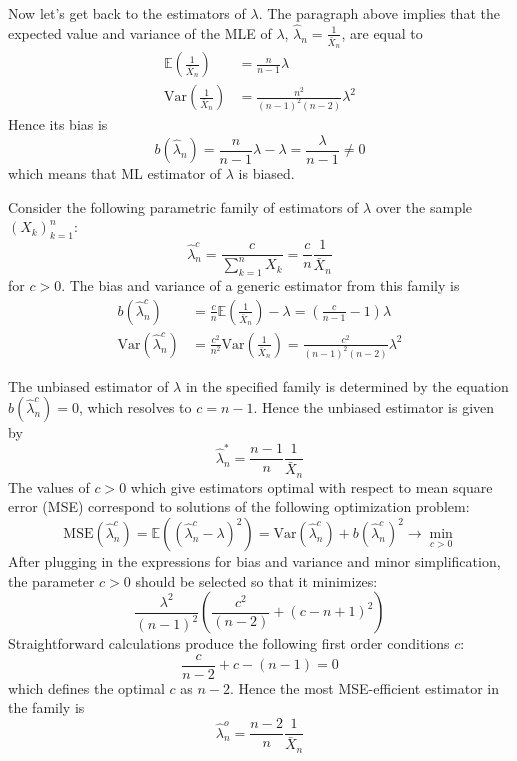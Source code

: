 \documentclass[a4paper]{article}
\newcommand{\brac}[1]{\left ( #1 \right )}
\newcommand{\Ex}[1]{\mathbb{E}\brac{#1}}
\newcommand{\Var}[1]{\text{Var}\brac{#1}}
\begin{document}
Now let's get back to the estimators of $\lambda$. The paragraph above implies that the expected value and variance of the MLE of $\lambda$, $\hat{\lambda}_n = \frac{1}{\bar{X}_n}$, are equal to\begin{align*}
\Ex{\frac{1}{\bar{X}_n}} &= \frac{n}{n-1}\lambda \\ \Var{\frac{1}{\bar{X}_n}} &= \frac{n^2}{\brac{n-1}^2\brac{n-2}} \lambda^2 \end{align*} Hence its bias is \[b\brac{\hat{\lambda}_n} = \frac{n}{n-1}\lambda - \lambda = \frac{\lambda}{n-1}\neq0\] which means that ML estimator of $\lambda$ is biased.

Consider the following parametric family of estimators of $\lambda$ over the sample $\brac{X_k}_{k=1}^n$: \[\hat{\lambda}_n^c = \frac{c}{\sum_{k=1}^n X_k} = \frac{c}{n} \frac{1}{\bar{X}_n}\] for $c>0$. The bias and variance of a generic estimator from this family is \begin{align*}
b\brac{\hat{\lambda}_n^c} &= \frac{c}{n} \Ex{\frac{1}{\bar{X}_n}}-\lambda = \brac{\frac{c}{n-1}-1}\lambda \\ \Var{\hat{\lambda}_n^c} &= \frac{c^2}{n^2}\Var{\frac{1}{\bar{X}_n}} = \frac{c^2}{\brac{n-1}^2\brac{n-2}} \lambda^2\end{align*}

The unbiased estimator of $\lambda$ in the specified family is determined by the equation $b\brac{\hat{\lambda}_n^c}=0$, which resolves to $c=n-1$. Hence the unbiased estimator is given by \[\hat{\lambda}_n^* = \frac{n-1}{n}\frac{1}{\bar{X}_n}\] The values of $c>0$ which give estimators optimal with respect to mean square error (MSE) correspond to solutions of the following optimization problem:\[\text{MSE}\brac{ \hat{\lambda}_n^c } = \Ex{\brac{ \hat{\lambda}_n^c - \lambda }^2} =  \Var{\hat{\lambda}_n^c} + b\brac{\hat{\lambda}_n^c}^2 \to \min_{c>0}\] After plugging in the expressions for bias and variance and minor simplification, the parameter $c>0$ should be selected so that it minimizes: \[\frac{\lambda^2}{\brac{n-1}^2} \brac{\frac{c^2}{\brac{n-2} } + \brac{c-n+1}^2}\] Straightforward calculations produce the following first order conditions $c$: \[\frac{c}{n-2} + c -\brac{n-1} = 0 \] which defines the optimal $c$ as $n-2$. Hence the most MSE-efficient estimator in the family is \[\hat{\lambda}_n^o = \frac{n-2}{n} \frac{1}{\bar{X}_n}\]
\end{document}
